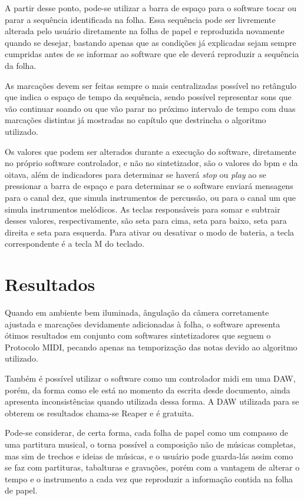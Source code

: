 \documentclass[12pt]{report}
\begin{document}
{A partir desse ponto, pode-se utilizar a barra de espaço para o software tocar ou parar a sequência identificada na folha. Essa sequência pode ser livremente alterada pelo usuário diretamente na folha de papel e reproduzida novamente quando se desejar, bastando apenas que as condições já explicadas sejam sempre cumpridas antes de se informar ao software que ele deverá reproduzir a sequência da folha.

As marcações devem ser feitas sempre o mais centralizadas possível no retângulo que indica o espaço de tempo da sequência, sendo possível representar sons que vão continuar soando ou que vão parar no próximo intervalo de tempo com duas marcações distintas já mostradas no capítulo que destrincha o algoritmo utilizado.

Os valores que podem ser alterados durante a execução do software, diretamente no próprio software controlador, e não no sintetizador, são o valores do bpm e da oitava, além de indicadores para determinar se haverá {\it stop} ou {\it play} ao se pressionar a barra de espaço e para determinar se o software enviará mensagens para o canal dez, que simula instrumentos de percussão, ou para o canal um que simula instrumentos melódicos. As teclas responsáveis para somar e subtrair desses valores, respectivamente, são seta para cima, seta para baixo, seta para direita e seta para esquerda. Para ativar ou desativar o modo de bateria, a tecla correspondente é a tecla M do teclado.


\chapter{Resultados}
\label{cha:resultados}

Quando em ambiente bem iluminada, ângulação da câmera corretamente ajustada e marcações devidamente adicionadas à folha, o software apresenta ótimos resultados em conjunto com softwares sintetizadores que seguem o Protocolo MIDI, pecando apenas na temporização das notas devido ao algoritmo utilizado.

Também é possível utilizar o software como um controlador midi em uma DAW, porém, da forma como ele está no momento da escrita desde documento, ainda apresenta inconsistências quando utilizada dessa forma. A DAW utilizada para se obterem os resultados chama-se Reaper e é gratuita.

Pode-se considerar, de certa forma, cada folha de papel como um compasso de uma partitura musical, o torna possível a composição não de músicas completas, mas sim de trechos e ideias de músicas, e o usuário pode guarda-lás assim como se faz com partituras, tabalturas e gravações, porém com a vantagem de alterar o tempo e o instrumento a cada vez que reproduzir a informação contida na folha de papel.

}
\end{document}

